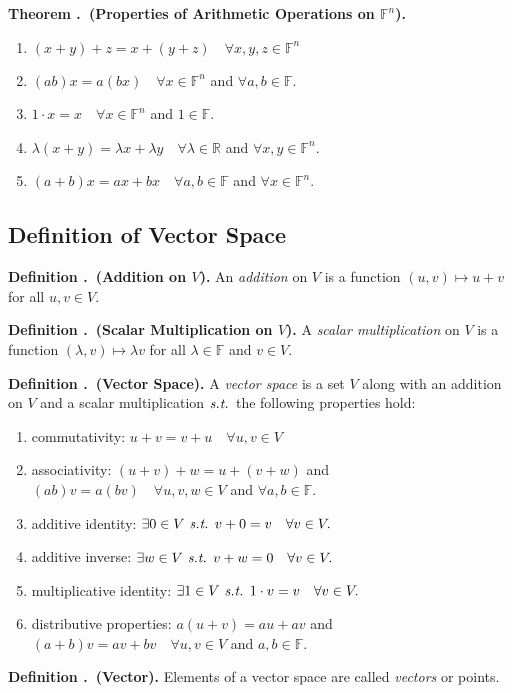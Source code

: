 \documentclass[11pt, letterpaper]{article}
\newcounter{ndf}[subsection]
\newenvironment*{df}[1]{\par\noindent\textbf{Definition \thesubsection.\stepcounter{ndf}\thendf\ (#1).}}{\par}
\newcounter{nthm}[subsection]
\newenvironment*{thm}[1]{\par\noindent\textbf{Theorem \thesubsection.\stepcounter{nthm}\thenthm\ (#1).}\par}{\par}
\def\R{{\mathbb{R}}}
\def\F{{\mathbb{F}}}
\def\st{\emph{ s.t. }}
\begin{document}
\begin{thm}{Properties of Arithmetic Operations on $\F^n$}
	\begin{enumerate}
		\item $(x+y)+z=x+(y+z)\quad\forall x,y,z\in\F^n$
		\item $(ab)x=a(bx)\quad\forall x\in\F^n$ and $\forall a,b\in\F.$
		\item $1\cdot x=x\quad\forall x\in\F^n$ and $1\in\F.$
		\item $\lambda(x+y)=\lambda x+\lambda y\quad\forall\lambda\in\R$ and $\forall x,y\in\F^n.$
		\item $(a+b)x=ax+bx\quad\forall a,b\in\F$ and $\forall x\in\F^n.$
	\end{enumerate}
\end{thm}

\subsection{Definition of Vector Space}
\begin{df}{Addition on $V$}
	An \textit{addition} on $V$ is a function $(u,v)\mapsto u+v$ for all $u,v\in V.$	
\end{df}
\begin{df}{Scalar Multiplication on $V$}
	A \textit{scalar multiplication} on $V$ is a function $(\lambda,v)\mapsto \lambda v$ for all $\lambda\in\F$ and $v\in V.$	
\end{df}
\begin{df}{Vector Space}
	A \textit{vector space} is a set $V$ along with an addition on $V$ and a scalar multiplication$\st$the following properties hold: 
	\begin{enumerate}
		\item commutativity: $u+v=v+u\quad\forall u,v\in V$
		\item associativity: $(u+v)+w=u+(v+w)$ and $(ab)v=a(bv)\quad\forall u,v,w\in V$ and $\forall a,b\in\F.$
		\item additive identity: $\exists0\in V\st v+0=v\quad\forall v\in V.$
		\item additive inverse: $\exists w\in V\st v+w=0\quad\forall v\in V.$
		\item multiplicative identity: $\exists1\in V\st1\cdot v=v\quad\forall v\in V.$
		\item distributive properties: $a(u+v)=au+av$ and $(a+b)v=av+bv\quad\forall u,v\in V$ and $a,b\in\F.$
	\end{enumerate}
\end{df}
\begin{df}{Vector}
	Elements of a vector space are called \textit{vectors} or points.	
\end{df}
\end{document}
